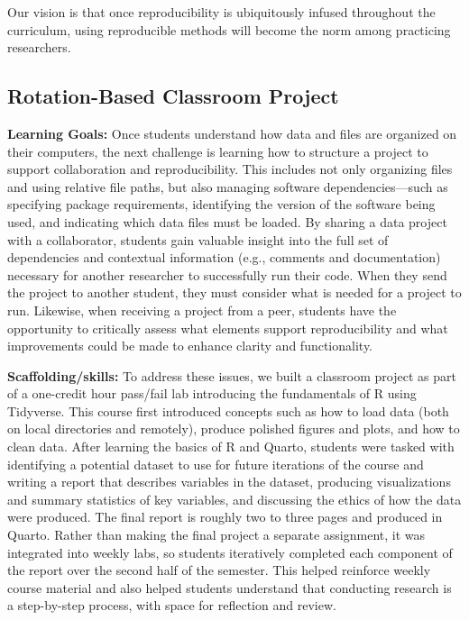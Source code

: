 \documentclass[
  12pt]{article}
\begin{document}
Our vision is that once reproducibility is ubiquitously infused throughout the curriculum, using reproducible methods will become the norm among practicing researchers.


\subsection{Rotation-Based Classroom Project} \label{sec-rotation}

\textbf{Learning Goals:} Once students understand how data and files are organized on their computers, the next challenge is learning how to structure a project to support collaboration and reproducibility.
This includes not only organizing files and using relative file paths, but also managing software dependencies—such as specifying package requirements, identifying the version of the software being used, and indicating which data files must be loaded.
By sharing a data project with a collaborator, students gain valuable insight into the full set of dependencies and contextual information (e.g., comments and documentation) necessary for another researcher to successfully run their code.
When they send the project to another student, they must consider what is needed for a project to run.
Likewise, when receiving a project from a peer, students have the opportunity to critically assess what elements support reproducibility and what improvements could be made to enhance clarity and functionality.


\textbf{Scaffolding/skills:} To address these issues, we built a classroom project as part of a one-credit hour pass/fail lab introducing the fundamentals of R using Tidyverse.
This course first introduced concepts such as how to load data (both on local directories and remotely), produce polished figures and plots, and how to clean data. 
After learning the basics of R and Quarto, students were tasked with identifying a potential dataset to use for future iterations of the course and writing a report that describes variables in the dataset, producing visualizations and summary statistics of key variables, and discussing the ethics of how the data were produced.
The final report is roughly two to three pages and produced in Quarto.
Rather than making the final project a separate assignment, it was integrated into weekly labs, so students iteratively completed each component of the report over the second half of the semester. 
This helped reinforce weekly course material and also helped students understand that conducting research is a step-by-step process, with space for reflection and review.
\end{document}
